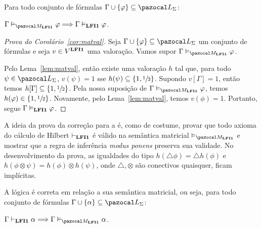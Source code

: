         \begin{corolario}\label{cor:matval}
            Para todo conjunto de fórmulas $\Gamma \cup \{\phi\} \subseteq \ling{}$:

            \centering
            $\Gamma \conmat \phi \Longrightarrow \Gamma \conval \phi$. 
        \end{corolario}

        \begin{proof}[Prova do Corolário~\ref{cor:matval}]
            Seja $\Gamma \cup \{\phi\} \subseteq \ling{}$ um conjunto de fórmulas e seja $v \in V^{{\normalfont\textbf{LFI1}}{}}$ uma valoração. Vamos supor $\Gamma \conmat \phi$.

            Pelo Lema~\ref{lem:matval}, então existe uma valoração $h$ tal que, para todo $\psi \in \ling{}$, $v(\psi) = 1$ sse $h(\psi) \subseteq \{1, \sfrac{1}{2}{}\}$. Supondo $v[\Gamma] = 1$, então temos $h[\Gamma] \subseteq \{1,\sfrac{1}{2}{}\}{}$. Pela nossa suposição de $\Gamma \conmat \phi$, temos $h(\varphi) \in \{1, \sfrac{1}{2}{}\}$. Novamente, pelo Lema~\ref{lem:matval}, temos $v(\phi) = 1$. Portanto, segue $\Gamma \vDash_{{\normalfont\textbf{LFI1}}{}} \varphi$.

        \end{proof}

        A ideia da prova da correção para a \lfium{} é, como de costume, provar que todo axioma do cálculo de Hilbert $\vdash_{{\normalfont\textbf{LFI1}}{}}$ é válido na semântica matricial $\conmat$ e mostrar que a regra de inferência \textit{modus ponens} preserva sua validade. No desenvolvimento da prova, as igualdades do tipo $h(\triangle \phi) = \triangle h(\phi)$ e $h(\phi \otimes \psi) = h(\phi) \otimes h(\psi)$, onde $\triangle, \otimes$ são conectivos quaisquer, ficam implícitas.


        \begin{teorema}\label{teo:correcao_mat}
            A lógica {\normalfont\lfium{}} é correta em relação a sua semântica matricial, ou seja, para todo conjunto de fórmulas $\Gamma \cup \{\alpha\} \subseteq \ling{}$:

            \centering
            {\normalfont{} $\Gamma \conhil \alpha \Longrightarrow \Gamma \conmat \alpha$.}
        \end{teorema}


